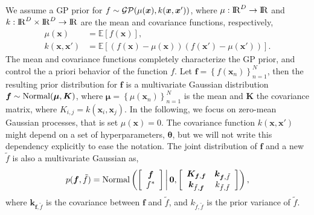 We assume a GP prior for $f \sim \operatorname{\mathcal{GP}}(\mu(\bm{x}), k(\bm{x}, \bm{x}'))$, where $\mu: {\rm I\!R}^D \to {\rm I\!R}$ and $k: {\rm I\!R}^D \times {\rm I\!R}^D \to {\rm I\!R}$ are the mean and covariance functions, respectively,
%
\begin{align*}
 	\mu(\bm{x}) &= \mathbb{E}\!\left[f(\bm{x})\right],\\ 
 	k(\bm{x}, \bm{x}') &= \mathbb{E}\!\left[\left( f(\bm{x}) - \mu(\bm{x}) \right)\left( f(\bm{x}') - \mu(\bm{x}') \right)\right].
\end{align*} 
%
The mean and covariance functions completely characterize the GP prior, and control the a priori behavior of the function $f$. Let $\bm{f}=\left\lbrace f(\bm{x}_n) \right\rbrace_{n=1}^N$, then the resulting prior distribution for $\bm{f}$ is a multivariate Gaussian distribution $\bm{f} \sim \operatorname{Normal}(\bm{\mu}, \bm{K})$, where $\bm{\mu} = \left\lbrace \mu(\bm{x}_n) \right\rbrace_{n=1}^N$ is the mean and $\bm{K}$ the covariance matrix, where $K_{i,j}=k(\bm{x}_i,\bm{x}_j)$. In the following, we focus on zero-mean Gaussian processes, that is set $\mu(\bm{x}) = 0$. The covariance function $k(\bm{x}, \bm{x}')$ might depend on a set of hyperparameters, $\bm{\theta}$, but we will not write this dependency explicitly to ease the notation. The joint distribution of $\bm{f}$ and a new $\tilde{f}$ is also a multivariate Gaussian as,
%
\begin{align*}
p(\bm{f}, \tilde{f})=\operatorname{Normal} \left( \left[ \begin{array}{cc}
\bm{f} \\ 
f^*
\end{array} \right] \,\middle|\, \bm{0},\left[ \begin{array}{cc}
\bm{K}_{\bm{f},\bm{f}} & \bm{k}_{\bm{f},\tilde{f}} \\ 
\bm{k}_{\tilde{f},\bm{f}} & k_{\tilde{f},\tilde{f}}
\end{array} \right] \right),
\end{align*}
%
where $\bm{k}_{\bm{f},\tilde{f}}$ is the covariance between $\bm{f}$ and $\tilde{f}$, and $k_{\tilde{f},\tilde{f}}$ is the prior variance of $\tilde{f}$. 

